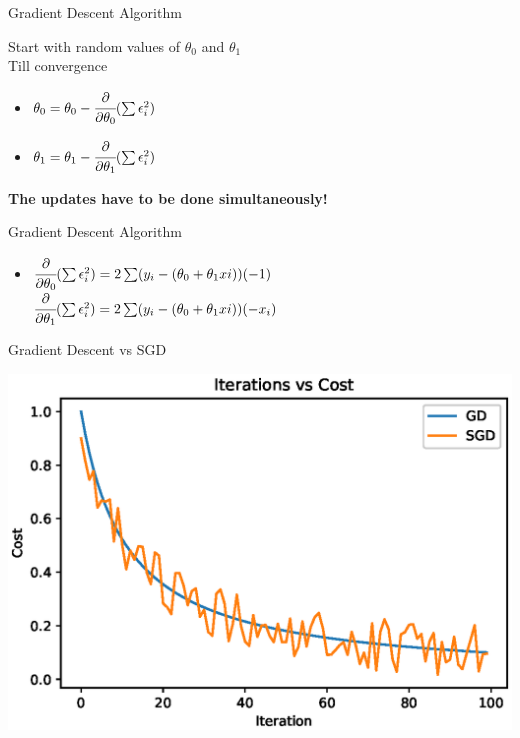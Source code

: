\documentclass{beamer}
\begin{document}
\begin{frame}{Gradient Descent Algorithm}
    
    Start with random values of $\theta_{0}$ and $\theta_{1}$\\
    Till convergence
    \begin{itemize}
        \item $\theta_{0} = \theta_{0} - \cfrac{\partial}{\partial \theta_{0}} (\sum \epsilon_{i}^{2}) $
        \item $\theta_{1} = \theta_{1} - \cfrac{\partial}{\partial \theta_{1}} (\sum \epsilon_{i}^{2}) $
    \end{itemize}
    
    \textbf{The updates have to be done simultaneously!}
\end{frame}

\begin{frame}{Gradient Descent Algorithm}
    
    \begin{itemize}
        \item $\cfrac{\partial}{\partial \theta_{0}} (\sum \epsilon_{i}^{2}) = 2\sum (y_{i} - (\theta_{0} + \theta_{1}x{i}))(-1)$
        $\cfrac{\partial}{\partial \theta_{1}} (\sum \epsilon_{i}^{2}) = 2\sum (y_{i} - (\theta_{0} + \theta_{1}x{i}))(-x_{i})$
    \end{itemize}
\end{frame}

\begin{frame}{Gradient Descent vs SGD}
  \begin{center}
       \includegraphics[totalheight=6cm]{gradient-descent/gd-sgd.eps}
   \end{center}
\end{frame}
\end{document}

